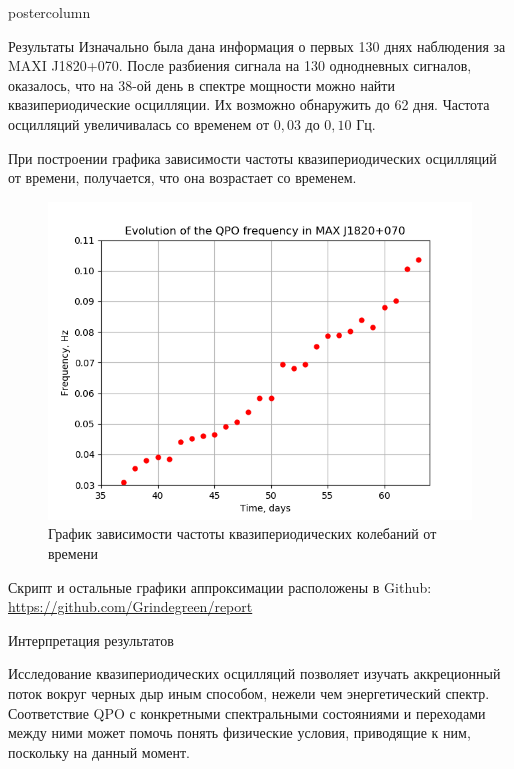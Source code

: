 \documentclass{beamer}
\begin{document}
\begin{frame}
\begin{columns}
\begin{column}{.57\textwidth}
\begin{beamercolorbox}[center]{postercolumn}
\begin{minipage}{.98\textwidth}
{\begin{myblock}{Результаты}
						Изначально была дана информация о первых 130 днях наблюдения за MAXI J1820+070. После разбиения сигнала на 130 однодневных сигналов, оказалось, что на 38-ой день в спектре мощности можно найти квазипериодические осцилляции. Их возможно обнаружить до 62 дня. Частота осцилляций увеличивалась со временем от $0{,}03$ до $0{,}10$ Гц.
						
						При построении графика зависимости частоты квазипериодических осцилляций от времени, получается, что она возрастает со временем.
						\begin{figure}[h]
							\centering
							\includegraphics[width=0.4\linewidth]{result}
							\caption{График зависимости частоты квазипериодических колебаний от времени}
						\end{figure}
						
						Скрипт и остальные графики аппроксимации расположены в Github: 
						\url{https://github.com/Grindegreen/report}
					
					\end{myblock}\vfill
					\begin{myblock}{Интерпретация результатов}
						
						Исследование квазипериодических осцилляций позволяет изучать аккреционный поток вокруг черных дыр иным способом, нежели чем энергетический спектр. Соответствие QPO с конкретными спектральными состояниями и переходами между ними может помочь понять физические условия, приводящие к ним, поскольку на данный момент.
						

\end{myblock}}
\end{minipage}
\end{beamercolorbox}
\end{column}
\end{columns}
\end{frame}
\end{document}
